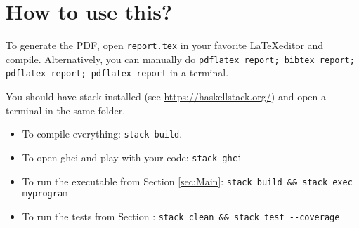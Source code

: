 
\section{How to use this?}

To generate the PDF, open \texttt{report.tex} in your favorite \LaTeX editor and compile.
Alternatively, you can manually do
\texttt{pdflatex report; bibtex report; pdflatex report; pdflatex report} in a terminal.

You should have stack installed (see \url{https://haskellstack.org/}) and
open a terminal in the same folder.

\begin{itemize}
  \item To compile everything: \verb|stack build|.
  \item To open ghci and play with your code: \verb|stack ghci|
  \item To run the executable from Section \ref{sec:Main}: \verb|stack build && stack exec myprogram|
  \item To run the tests from Section : \verb|stack clean && stack test --coverage|
\end{itemize}
